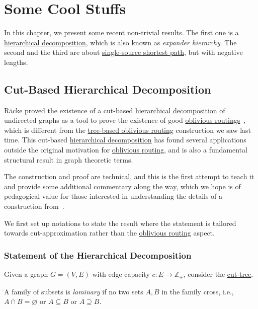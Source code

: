 \chapter{Some Cool Stuffs}
In this chapter, we present some recent non-trivial results. The first one is a \hyperref[def:hierarchical-decomposition]{hierarchical decomposition}, which is also known as \emph{expander hierarchy}. The second and the third are about \hyperref[prb:SSSP]{single-source shortest path}, but with negative lengths.

\section{Cut-Based Hierarchical Decomposition}
Räcke proved the existence of a cut-based \hyperref[def:hierarchical-decomposition]{hierarchical decomposition} of undirected graphs as a tool to prove the existence of good \hyperref[prb:oblivious-routing]{oblivious routings}~\cite{racke2002minimizing}, which is different from the \hyperref[not:tree-based-oblivious-routing]{tree-based oblivious routing} construction we saw last time. This cut-based \hyperref[def:hierarchical-decomposition]{hierarchical decomposition} has found several applications outside the original motivation for \hyperref[prb:oblivious-routing]{oblivious routing}, and is also a fundamental structural result in graph theoretic terms.

\begin{note}
	The construction and proof are technical, and this is the first attempt to teach it and provide some additional commentary along the way, which we hope is of pedagogical value for those interested in understanding the details of a construction from~\cite{bienkowski2003practical}.
\end{note}

We first set up notations to state the result where the statement is tailored towards cut-approximation rather than the \hyperref[prb:oblivious-routing]{oblivious routing} aspect.

\subsection{Statement of the Hierarchical Decomposition}
Given a graph \(G = (V, E)\) with edge capacity \(c \colon E \to \mathbb{Z} _+\), consider the \hyperref[def:cut-tree]{cut-tree}.

\begin{definition}[Laminary]\label{def:laminary}
	A family of subsets is \emph{laminary} if no two sets \(A, B\) in the family cross, i.e., \(A \cap B = \varnothing \) or \(A \subseteq B\) or \(A \supseteq B\).
\end{definition}

